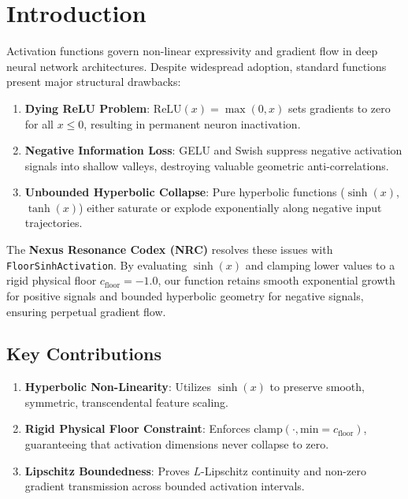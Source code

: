 \section{Introduction}

Activation functions govern non-linear expressivity and gradient flow in deep neural network architectures. Despite widespread adoption, standard functions present major structural drawbacks:
\begin{enumerate}
    \item \textbf{Dying ReLU Problem}: $\text{ReLU}(x) = \max(0, x)$ sets gradients to zero for all $x \le 0$, resulting in permanent neuron inactivation.
    \item \textbf{Negative Information Loss}: GELU and Swish suppress negative activation signals into shallow valleys, destroying valuable geometric anti-correlations.
    \item \textbf{Unbounded Hyperbolic Collapse}: Pure hyperbolic functions ($\sinh(x)$, $\tanh(x)$) either saturate or explode exponentially along negative input trajectories.
\end{enumerate}

The \textbf{Nexus Resonance Codex (NRC)} resolves these issues with \texttt{FloorSinhActivation}. By evaluating $\sinh(x)$ and clamping lower values to a rigid physical floor $c_{\text{floor}} = -1.0$, our function retains smooth exponential growth for positive signals and bounded hyperbolic geometry for negative signals, ensuring perpetual gradient flow.

\subsection{Key Contributions}
\begin{enumerate}[label=\textbf{\arabic*.}]
    \item \textbf{Hyperbolic Non-Linearity}: Utilizes $\sinh(x)$ to preserve smooth, symmetric, transcendental feature scaling.
    \item \textbf{Rigid Physical Floor Constraint}: Enforces $\text{clamp}(\cdot, \text{min}=c_{\text{floor}})$, guaranteeing that activation dimensions never collapse to zero.
    \item \textbf{Lipschitz Boundedness}: Proves $L$-Lipschitz continuity and non-zero gradient transmission across bounded activation intervals.
\end{enumerate}
